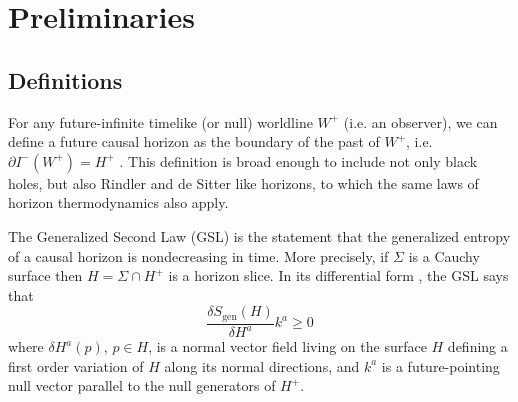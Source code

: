 \documentclass[12pt]{article}
\theoremstyle{remark}
\numberwithin{equation}{section}
\numberwithin{equation}{section}
\begin{document}
%
%
 

\section{Preliminaries}

\subsection{Definitions}\label{Definitions}

For any future-infinite timelike (or null) worldline $W^+$ (i.e. an observer), we can define a future causal horizon as the boundary of the past of $W^+$, i.e. $\partial I^{-}(W^+)= H^+$ \cite{JacobsonParentani}.  This definition is broad enough to include not only black holes, but also Rindler and de Sitter like horizons, to which the same laws of horizon thermodynamics also apply.  

The Generalized Second Law (GSL) is the statement that the generalized entropy of a causal horizon is nondecreasing in time.  More precisely, if $\Sigma$ is a Cauchy surface then $H=\Sigma \cap H^+$ is a horizon slice.  In its differential form \cite{Wall:2009wm}, the GSL says that 
\begin{equation}\label{gsl}
\frac{\delta S_\mathrm{gen}(H)}{\delta H^{a}}k^{a}\geq 0
\end{equation}
where $\delta H^{a}(p)$, $p \in H$, is a normal vector field living on the surface $H$ defining a first order variation of $H$ along its normal directions, and $k^{a}$ is a future-pointing null vector parallel to the null generators of $H^+$.  
\end{document}
